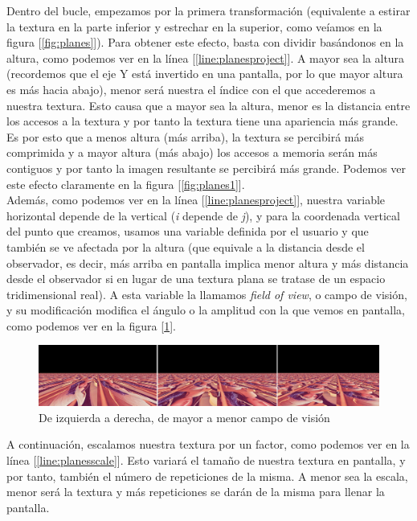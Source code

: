 Dentro del bucle, empezamos por la primera transformación (equivalente a estirar la textura en la parte inferior y estrechar en la superior, como veíamos en la figura [\ref{fig:planes}]). Para obtener este efecto, basta con dividir basándonos en la altura, como podemos ver en la línea [\ref{line:planesproject}]. A mayor sea la altura (recordemos que el eje Y está invertido en una pantalla, por lo que mayor altura es más hacia abajo), menor será nuestra el índice con el que accederemos a nuestra textura. Esto causa que a mayor sea la altura, menor es la distancia entre los accesos a la textura y por tanto la textura tiene una apariencia más grande. Es por esto que a menos altura (más arriba), la textura se percibirá más comprimida y a mayor altura (más abajo) los accesos a memoria serán más contiguos y por tanto la imagen resultante se percibirá más grande. Podemos ver este efecto claramente en la figura [\ref{fig:planes1}].\\

Además, como podemos ver en la línea [\ref{line:planesproject}], nuestra variable horizontal depende de la vertical (\emph{i} depende de \emph{j}), y para la coordenada vertical del punto que creamos, usamos una variable definida por el usuario y que también se ve afectada por la altura (que equivale a la distancia desde el observador, es decir, más arriba en pantalla implica menor altura y más distancia desde el observador si en lugar de una textura plana se tratase de un espacio tridimensional real). A esta variable la llamamos \emph{field of view}, o campo de visión, y su modificación modifica el ángulo o la amplitud con la que vemos en pantalla, como podemos ver en la figura [\ref{fig:planes2}].

\begin{figure}[h]
	\centering
	\includegraphics[width=14cm]{archivos/planes2}
	\caption{De izquierda a derecha, de mayor a menor campo de visión}
	\label{fig:planes2}
\end{figure}

A continuación, escalamos nuestra textura por un factor, como podemos ver en la línea [\ref{line:planesscale}]. Esto variará el tamaño de nuestra textura en pantalla, y por tanto, también el número de repeticiones de la misma. A menor sea la escala, menor será la textura y más repeticiones se darán de la misma para llenar la pantalla.\\

